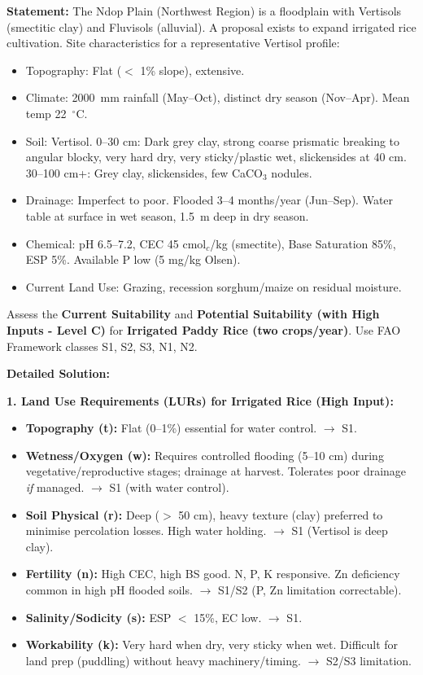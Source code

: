 \documentclass[11pt]{article}
\begin{document}
\begin{exoresolu}
\textbf{Statement:} The Ndop Plain (Northwest Region) is a floodplain with Vertisols (smectitic clay) and Fluvisols (alluvial). A proposal exists to expand irrigated rice cultivation. Site characteristics for a representative Vertisol profile:
\begin{itemize}
\item Topography: Flat ($<$ 1\% slope), extensive.
\item Climate: \SI{2000}{mm} rainfall (May--Oct), distinct dry season (Nov--Apr). Mean temp \SI{22}{\ensuremath{{}^{\circ}\mathrm{C}}}.
\item Soil: Vertisol. 0--30 cm: Dark grey clay, strong coarse prismatic breaking to angular blocky, very hard dry, very sticky/plastic wet, slickensides at 40 cm. 30--100 cm+: Grey clay, slickensides, few CaCO$_3$ nodules.
\item Drainage: Imperfect to poor. Flooded 3--4 months/year (Jun--Sep). Water table at surface in wet season, \SI{1.5}{m} deep in dry season.
\item Chemical: pH 6.5--7.2, CEC 45 cmol$_c$/kg (smectite), Base Saturation 85\%, ESP 5\%. Available P low (5 mg/kg Olsen).
\item Current Land Use: Grazing, recession sorghum/maize on residual moisture.
\end{itemize}
Assess the \textbf{Current Suitability} and \textbf{Potential Suitability (with High Inputs - Level C)} for \textbf{Irrigated Paddy Rice (two crops/year)}. Use FAO Framework classes S1, S2, S3, N1, N2.

\tcblower
\textbf{Detailed Solution:}

\noindent\textbf{1. Land Use Requirements (LURs) for Irrigated Rice (High Input):}
\begin{itemize}
\item \textbf{Topography (t):} Flat (0--1\%) essential for water control. $\rightarrow$ S1.
\item \textbf{Wetness/Oxygen (w):} Requires controlled flooding (5--10 cm) during vegetative/reproductive stages; drainage at harvest. Tolerates poor drainage \emph{if} managed. $\rightarrow$ S1 (with water control).
\item \textbf{Soil Physical (r):} Deep ($>$ 50 cm), heavy texture (clay) preferred to minimise percolation losses. High water holding. $\rightarrow$ S1 (Vertisol is deep clay).
\item \textbf{Fertility (n):} High CEC, high BS good. N, P, K responsive. Zn deficiency common in high pH flooded soils. $\rightarrow$ S1/S2 (P, Zn limitation correctable).
\item \textbf{Salinity/Sodicity (s):} ESP $<$ 15\%, EC low. $\rightarrow$ S1.
\item \textbf{Workability (k):} Very hard when dry, very sticky when wet. Difficult for land prep (puddling) without heavy machinery/timing. $\rightarrow$ S2/S3 limitation.
\end{itemize}


\end{exoresolu}
\end{document}
